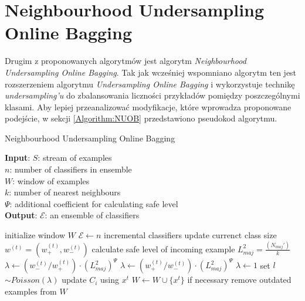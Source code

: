 \newpage

\section{Neighbourhood Undersampling Online Bagging}

\noindent Drugim z proponowanych algorytmów jest algorytm \textit{Neighbourhood Undersampling Online Bagging}. Tak jak wcześniej wspomniano algorytm ten jest rozszerzeniem algorytmu \textit{Undersampling Online Bagging} i wykorzystuje technikę \textit{undersampling'u} do zbalansowania liczności przykładów pomiędzy poszczególnymi klasami. Aby lepiej przeanalizować modyfikacje, które wprowadza proponowane podejście, w sekcji \ref{Algorithm:NUOB} przedstawiono pseudokod algorytmu.

\begin{algorithm}
    \caption{Neighbourhood Undersampling Online Bagging}\label{Algorithm:NUOB}
    \textbf{Input}: $S$: stream of examples \\
    \hspace*{12mm} $n$: number of classifiers in ensemble \\
    \hspace*{12mm} $W$: window of examples \\
    \hspace*{12mm} $k$: number of nearest neighbours \\
    \hspace*{12mm} $\Psi$: additional coefficient for calculating safe level \\
    \textbf{Output}: $\mathcal{E}$: an ensemble of classifiers \\
    \begin{algorithmic}[1]
    \State initialize window $W$
    \State $\mathcal{E} \gets n$ incremental classifiers
    \State update currenct class size $w^{(t)} = (w^{(t)}_{+}, w^{(t)}_{-})$
    \State calculate safe level of incoming example $L^2_{maj} = \frac{(N_{maj}')}{k}$
    \vspace{0.5em}
    \State $\lambda \gets (w^{(t)}_{-}/w^{(t)}_{+}) \cdot (L^2_{maj})^{\Psi}$
    \vspace{0.5em}
    \vspace{0.5em}
    \State $\lambda \gets (w^{(t)}_{+}/w^{(t)}_{-}) \cdot (L^2_{maj})^{\Psi}$
    \vspace{0.4em}
    \Else
    \State $\lambda \gets 1$
    \EndIf
    \State set $l$ $\sim Poisson(\lambda)$
    \State update $C_i$ using $x^t$
    \EndFor
    \EndFor
    \State $W \gets W \cup \{x^t\}$
    \State if necessary remove outdated examples from $W$
    \EndFor
    \end{algorithmic}
\end{algorithm}

